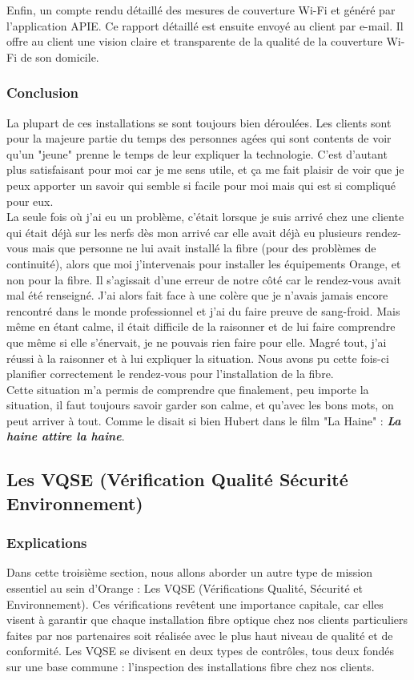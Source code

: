 \documentclass[12pt, a4paper]{article}
\begin{document}
Enfin, un compte rendu détaillé des mesures de couverture Wi-Fi
et généré par l'application APIE. Ce rapport détaillé est
ensuite envoyé au client par e-mail. Il offre au client une
vision claire et transparente de la qualité de la couverture Wi-Fi
de son domicile.
\subsubsection{Conclusion}
La plupart de ces installations se sont toujours 
bien déroulées. Les clients sont pour la majeure partie
du temps des personnes agées qui sont contents 
de voir qu'un "jeune" prenne le temps de leur 
expliquer la technologie. C'est d'autant plus 
satisfaisant pour moi car je me sens utile, et 
ça me fait plaisir de voir que je peux 
apporter un savoir qui semble si facile pour moi 
mais qui est si compliqué pour eux.\\

La seule fois où j'ai eu un problème, c'était
lorsque je suis arrivé chez une cliente qui était 
déjà sur les nerfs dès mon arrivé car elle avait
déjà eu plusieurs rendez-vous mais que personne 
ne lui avait installé la fibre (pour des problèmes
de continuité), alors que moi 
j'intervenais pour installer les équipements 
Orange, et non pour la fibre. Il s'agissait d'une erreur 
de notre côté car le rendez-vous avait mal 
été renseigné. J'ai alors fait face à une colère 
que je n'avais jamais encore rencontré dans le monde 
professionnel et j'ai du faire preuve de sang-froid. 
Mais même en étant calme, il était 
difficile de la raisonner et de lui faire comprendre 
que même si elle s'énervait, je ne pouvais rien faire
pour elle. Magré tout, j'ai réussi à la raisonner et
à lui expliquer la situation. Nous 
avons pu cette fois-ci planifier correctement 
le rendez-vous pour l'installation de la fibre.\\

Cette situation m'a permis de comprendre que 
finalement, peu importe la situation, il faut
toujours savoir garder son calme, et qu'avec les 
bons mots, on peut arriver à tout. Comme le disait 
si bien Hubert dans le film 
"La Haine" : \textbf{\textit{La haine attire la haine}}.

\newpage
\subsection{Les VQSE (Vérification Qualité Sécurité Environnement)}
\subsubsection{Explications}
Dans cette troisième section, nous allons
aborder un autre type de mission essentiel
au sein d'Orange : Les VQSE (Vérifications
Qualité, Sécurité et Environnement). 
Ces vérifications revêtent une
importance capitale, car elles visent
à garantir que chaque installation
fibre optique chez nos clients
particuliers faites par nos partenaires
soit réalisée avec le
plus haut niveau de qualité et de conformité.
Les VQSE se divisent en deux types de contrôles,
tous deux fondés sur une base commune :
l'inspection des installations
fibre chez nos clients.
\end{document}
